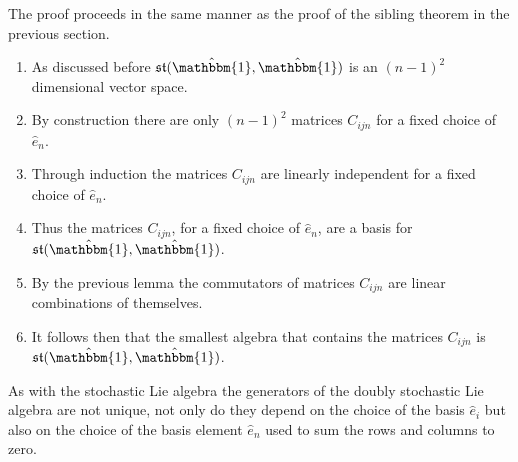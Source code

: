 \begin{IEEEproof}
	The proof proceeds in the same manner as the proof of the sibling theorem in
	the previous section.
	\begin{enumerate}
		\item As discussed before $\mathfrak{st}(\hat{\mathbbm{1}}, \hat{\mathbbm{1}})$
		is an $\left(n-1\right)^2$ dimensional vector space.
		\item By construction there are only $\left(n-1\right)^2$ matrices $C_{ijn}$
		for a fixed choice of $\hat{e}_n$.
		\item Through induction the matrices $C_{ijn}$ are linearly independent for
		a fixed choice of $\hat{e}_n$.
		\item Thus the matrices $C_{ijn}$, for a fixed choice of $\hat{e}_n$, are a 
		basis for $\mathfrak{st}(\hat{\mathbbm{1}}, \hat{\mathbbm{1}})$.
		\item By the previous lemma the commutators of matrices $C_{ijn}$ are linear
		combinations of themselves.
		\item It follows then that the smallest algebra that contains the matrices $C_{ijn}$
		is $\mathfrak{st}(\hat{\mathbbm{1}}, \hat{\mathbbm{1}})$.\hfill\IEEEQEDhere
	\end{enumerate}
\end{IEEEproof}

As with the stochastic Lie algebra the generators of the doubly stochastic Lie 
algebra are not unique, not only do they depend on the choice of the basis $\hat{e}_i$ 
but also on the choice of the basis element $\hat{e}_n$ used to sum the rows and 
columns to zero.




